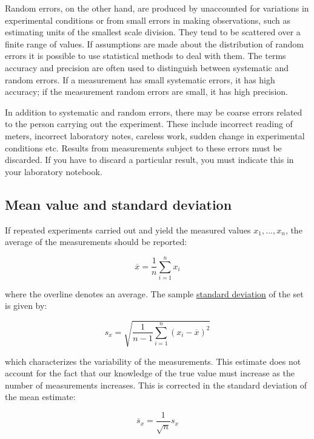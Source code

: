 \documentclass[byrevtex,amssymb,aps,pra,floatfix,letterpaper]{revtex4}
\begin{document}
Random errors, on the other hand, are produced by unaccounted for variations in experimental conditions or from small errors in making observations, such as estimating units of the smallest scale division. They tend to be scattered over a finite range of values. If assumptions are made about the distribution of random errors it is possible to use statistical methods to deal with them. The terms accuracy and precision are often used to distinguish between systematic and random errors. If a measurement has small systematic errors, it has high accuracy; if the measurement random errors are small, it has high precision.

In addition to systematic and random errors, there may be coarse errors related to the person carrying out the experiment. These include incorrect reading of meters, incorrect laboratory notes, careless work, sudden change in experimental conditions etc. Results from measurements subject to these errors must be discarded. If you have to discard a particular result, you must indicate this in your laboratory notebook.

\subsection{Mean value and standard deviation}

If repeated experiments carried out and yield the measured values $x_1, ..., x_n$, the average of the measurements should be reported:

\begin{equation}
\label{eq11}
\overline{x} = \frac{1}{n}\sum\limits_{i=1}^{n} x_i
\end{equation}

\noindent
where the overline denotes an average. The sample \href{http://en.wikipedia.org/wiki/Standard_deviation}{\underline{standard deviation}} of the set is given by:

\begin{equation}
\label{eq12}
s_x = \sqrt{\frac{1}{n-1}\sum\limits_{i=1}^{n}\left(x_i - \overline{x}\right)^2}
\end{equation}

\noindent
which characterizes the variability of the measurements. This estimate does not account for the
fact that our knowledge of the true value must increase as the number of measurements increases.
This is corrected in the standard deviation of the mean estimate:

\begin{equation}
\label{eq13}
\overline{s}_x = \frac{1}{\sqrt{n}}s_x
\end{equation}
\end{document}
